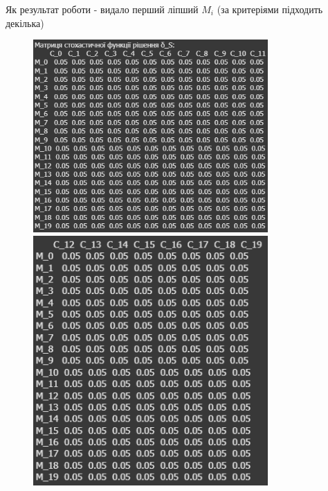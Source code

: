 Як результат роботи - видало перший ліпший $M_{i}$ (за критеріями підходить декілька)
\begin{figure}[!ht]
        \centering
        \begin{minipage}{0.55\linewidth}
            \includegraphics[width=0.8\textwidth, scale=0.6]{ReportPic/report_5.1.png}
        \end{minipage}
        \begin{minipage}{0.4\linewidth}
            \includegraphics[width=0.8\textwidth, scale=0.5]{ReportPic/report_5.2.png}
        \end{minipage}
\end{figure}
